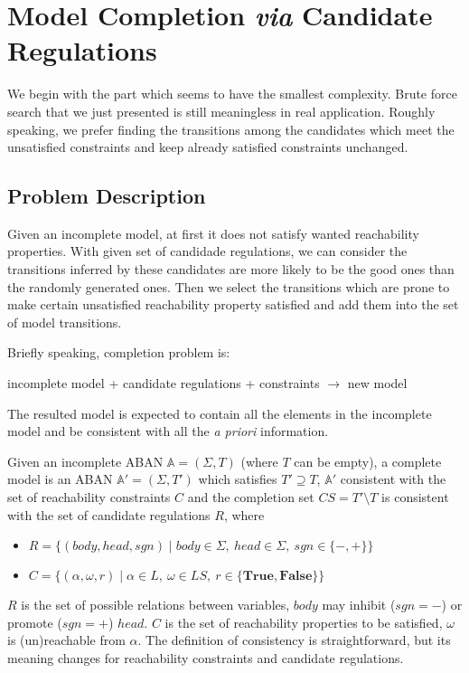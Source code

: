 \section{Model Completion \textit{via} Candidate Regulations}\label{sec:modelInference}
We begin with the part which seems to have the smallest complexity.
Brute force search that we just presented is still meaningless in real application.
Roughly speaking, we prefer finding the transitions among the candidates which meet the unsatisfied constraints and keep already satisfied constraints unchanged.

\subsection{Problem Description}
Given an incomplete model, at first it does not satisfy wanted reachability properties.
With given set of candidade regulations, we can consider the transitions inferred by these candidates are more likely to be the good ones than the randomly generated ones.
Then we select the transitions which are prone to make certain unsatisfied reachability property satisfied and add them into the set of model transitions.

Briefly speaking, completion problem is:

incomplete model + candidate regulations + constraints $\to$ new model

The resulted model is expected to contain all the elements in the incomplete model and be consistent with all the \textit{a priori} information. 

\begin{definition}
    Given an incomplete ABAN $\mathbb{A}=(\Sigma,T)$ (where $T$ can be empty), a complete model is an ABAN $\mathbb{A}'=(\Sigma,T')$ which satisfies $T'\supseteq T$, $\mathbb{A}'$ consistent with the set of reachability constraints $C$ and the completion set $CS=T'\setminus T$ is consistent with the set of candidate regulations $R$, where
    \begin{itemize}
        \item $R=\{(body,head,sgn)\mid body\in \Sigma,\ head\in \Sigma,\ sgn\in \{-,+\}\}$ 
        \item $C=\{(\alpha,\omega,r)\mid\alpha \in L,\ \omega\in LS,\ r\in \{\mathbf{True,False}\}\}$
    \end{itemize}
\end{definition}

$R$ is the set of possible relations between variables, $body$ may inhibit ($sgn=-$) or promote ($sgn=+$) $head$.
$C$ is the set of reachability properties to be satisfied, $\omega$ is (un)reachable from $\alpha$.
The definition of consistency is straightforward, but its meaning changes for reachability constraints and candidate regulations.


